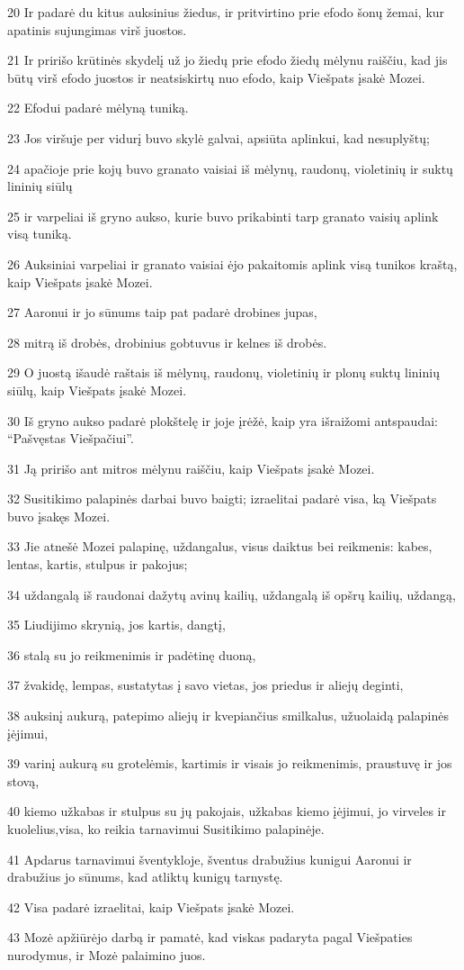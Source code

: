 \par 20 Ir padarė du kitus auksinius žiedus, ir pritvirtino prie efodo šonų žemai, kur apatinis sujungimas virš juostos. 
\par 21 Ir pririšo krūtinės skydelį už jo žiedų prie efodo žiedų mėlynu raiščiu, kad jis būtų virš efodo juostos ir neatsiskirtų nuo efodo, kaip Viešpats įsakė Mozei. 
\par 22 Efodui padarė mėlyną tuniką. 
\par 23 Jos viršuje per vidurį buvo skylė galvai, apsiūta aplinkui, kad nesuplyštų; 
\par 24 apačioje prie kojų buvo granato vaisiai iš mėlynų, raudonų, violetinių ir suktų lininių siūlų 
\par 25 ir varpeliai iš gryno aukso, kurie buvo prikabinti tarp granato vaisių aplink visą tuniką. 
\par 26 Auksiniai varpeliai ir granato vaisiai ėjo pakaitomis aplink visą tunikos kraštą, kaip Viešpats įsakė Mozei. 
\par 27 Aaronui ir jo sūnums taip pat padarė drobines jupas, 
\par 28 mitrą iš drobės, drobinius gobtuvus ir kelnes iš drobės. 
\par 29 O juostą išaudė raštais iš mėlynų, raudonų, violetinių ir plonų suktų lininių siūlų, kaip Viešpats įsakė Mozei. 
\par 30 Iš gryno aukso padarė plokštelę ir joje įrėžė, kaip yra išraižomi antspaudai: “Pašvęstas Viešpačiui”. 
\par 31 Ją pririšo ant mitros mėlynu raiščiu, kaip Viešpats įsakė Mozei. 
\par 32 Susitikimo palapinės darbai buvo baigti; izraelitai padarė visa, ką Viešpats buvo įsakęs Mozei. 
\par 33 Jie atnešė Mozei palapinę, uždangalus, visus daiktus bei reikmenis: kabes, lentas, kartis, stulpus ir pakojus; 
\par 34 uždangalą iš raudonai dažytų avinų kailių, uždangalą iš opšrų kailių, uždangą, 
\par 35 Liudijimo skrynią, jos kartis, dangtį, 
\par 36 stalą su jo reikmenimis ir padėtinę duoną, 
\par 37 žvakidę, lempas, sustatytas į savo vietas, jos priedus ir aliejų deginti, 
\par 38 auksinį aukurą, patepimo aliejų ir kvepiančius smilkalus, užuolaidą palapinės įėjimui, 
\par 39 varinį aukurą su grotelėmis, kartimis ir visais jo reikmenimis, praustuvę ir jos stovą, 
\par 40 kiemo užkabas ir stulpus su jų pakojais, užkabas kiemo įėjimui, jo virveles ir kuolelius,­visa, ko reikia tarnavimui Susitikimo palapinėje. 
\par 41 Apdarus tarnavimui šventykloje, šventus drabužius kunigui Aaronui ir drabužius jo sūnums, kad atliktų kunigų tarnystę. 
\par 42 Visa padarė izraelitai, kaip Viešpats įsakė Mozei. 
\par 43 Mozė apžiūrėjo darbą ir pamatė, kad viskas padaryta pagal Viešpaties nurodymus, ir Mozė palaimino juos.



